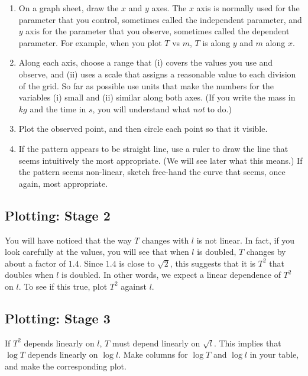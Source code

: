 \begin{enumerate}
    \item On a graph sheet, draw the $x$ and $y$ axes. The $x$ axis is normally used for the parameter that you control, sometimes called the independent parameter, and $y$ axis for the parameter that you observe, sometimes called the dependent parameter. For example, when you plot $T$ vs $m$, $T$ is along $y$ and $m$ along $x$. 
    
    \item Along each axis, choose a range that (i) covers the values you use and observe, and (ii) uses a scale that assigns a reasonable value to each division of the grid. So far as possible use units that make the numbers for the variables (i) small and (ii) similar along both axes. (If you write the mass in $kg$ and the time in $s$, you will understand what \textit{not} to do.) 
    
    \item Plot the observed point, and then circle each point so that it visible. 
    
    \item If the pattern appears to be straight line, use a ruler to draw the line that seems intuitively the most appropriate. (We will see later what this means.) If the pattern seems non-linear, sketch free-hand the curve that seems, once again, most appropriate.
    
\end{enumerate}

\subsection{Plotting: Stage 2}

You will have noticed that the way $T$ changes with $l$ is not linear. In fact, if you look carefully at the values, you will see that when $l$ is doubled, $T$ changes by about a factor of $1.4$. Since $1.4$ is close to $\sqrt{2}$, this suggests that it is $T^2$ that doubles when $l$ is doubled. In other words, we expect a linear dependence of $T^2$ on $l$. To see if this true, plot $T^2$ against $l$.

\subsection{Plotting: Stage 3}

If $T^2$ depends linearly on $l$, $T$ must depend linearly on $\sqrt{l}$. This implies that $\log T$ depends linearly on $\log l$. Make columns for $\log T$ and $\log l$ in your table, and make the corresponding plot. 

